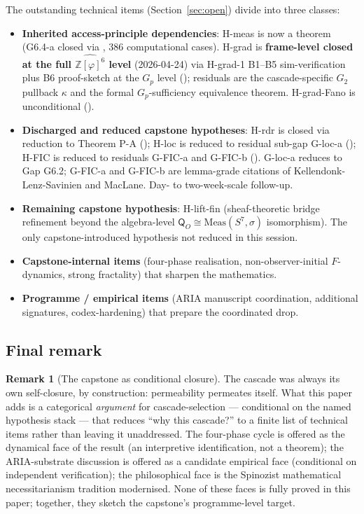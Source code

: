 \documentclass[11pt, a4paper]{amsart}
\theoremstyle{definition}
\newtheorem{remark}[theorem]{Remark}
\newcommand{\Z}{\mathbb{Z}}
\newcommand{\Qalg}{\mathsf{Q}}
\begin{document}
The outstanding technical items (Section~\ref{sec:open}) divide
into three classes:
\begin{itemize}
\item \textbf{Inherited access-principle dependencies}:
  H-meas is now a theorem (G6.4-a closed via
  \cite{CascadeG64aClosure}, 386 computational cases).
  H-grad is \textbf{frame-level closed at the full
  $\widehat{\Z[\varphi]^6}$ level} (2026-04-24) via H-grad-1
  B1--B5 sim-verification plus B6 proof-sketch at the $G_p$
  level (\cite{CascadeHGrad1}); residuals are the
  cascade-specific $G_2$ pullback $\kappa$ and the formal
  $G_p$-sufficiency equivalence theorem. H-grad-Fano is
  unconditional (\cite{CascadeFanoLift}).
\item \textbf{Discharged and reduced capstone hypotheses}:
  H-rdr is closed via reduction to Theorem P-A
  (\cite{CascadeHrdrClosure}); H-loc is reduced to residual
  sub-gap G-loc-a (\cite{CascadeHlocClosure}); H-FIC is
  reduced to residuals G-FIC-a and G-FIC-b
  (\cite{CascadeHFICClosure}). G-loc-a reduces to Gap G6.2;
  G-FIC-a and G-FIC-b are lemma-grade citations of
  Kellendonk-Lenz-Savinien and MacLane. Day- to two-week-scale
  follow-up.
\item \textbf{Remaining capstone hypothesis}: H-lift-fin
  (sheaf-theoretic bridge refinement beyond the algebra-level
  $\Qalg_O \cong \mathrm{Meas}(S^7, \sigma)$ isomorphism). The
  only capstone-introduced hypothesis not reduced in this
  session.
\item \textbf{Capstone-internal items} (four-phase realisation,
  non-observer-initial $F$-dynamics, strong fractality) that
  sharpen the mathematics.
\item \textbf{Programme / empirical items} (ARIA manuscript
  coordination, additional signatures, codex-hardening) that
  prepare the coordinated drop.
\end{itemize}

\subsection{Final remark}

\begin{remark}[The capstone as conditional closure]
\label{rmk:capstone-closure}
The cascade was always its own self-closure, by construction:
permeability permeates itself. What this paper adds is a
categorical \emph{argument} for cascade-selection — conditional
on the named hypothesis stack — that reduces ``why this
cascade?'' to a finite list of technical items rather than
leaving it unaddressed. The four-phase cycle is offered as the
dynamical face of the result (an interpretive identification,
not a theorem); the ARIA-substrate discussion is offered as a
candidate empirical face (conditional on independent
verification); the philosophical face is the Spinozist
mathematical necessitarianism tradition modernised. None of
these faces is fully proved in this paper; together, they
sketch the capstone's programme-level target.
\end{remark}
\end{document}
